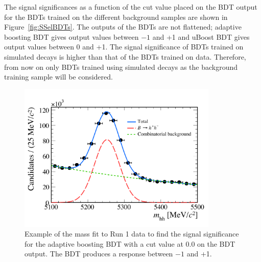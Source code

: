 The signal significances as a function of the cut value placed on the BDT output for the BDTs trained on the different background samples are shown in Figure~\ref{fig:SSelBDTs}. The outputs of the BDTs are not flattened; adaptive boosting BDT gives output values between $-1$ and +1 and uBoost BDT gives output values between 0 and +1. The signal significance of BDTs trained on simulated decays is higher than that of the BDTs trained on data. %
Therefore, from now on only BDTs trained using simulated decays as the background training sample will be considered.
\begin{figure}[tbp]
    \centering
        \includegraphics[width=0.85\textwidth]{./Figs/Selection/mass_example.pdf}
    \caption{Example of the mass fit to \bhh Run 1 data to find the signal significance for the adaptive boosting BDT with a cut value at 0.0 on the BDT output. The BDT produces a response between $-1$ and +1.}
    \label{fig:massEG}
\end{figure}

